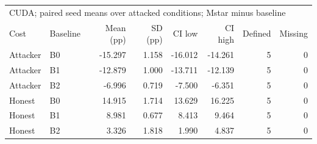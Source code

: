 \begin{tabular}{llrrrrrr}
\toprule
\multicolumn{8}{l}{CUDA; paired seed means over attacked conditions; Mstar minus baseline} \\
Cost & Baseline & Mean (pp) & SD (pp) & CI low & CI high & Defined & Missing \\
\midrule
Attacker & B0 & -15.297 & 1.158 & -16.012 & -14.261 & 5 & 0 \\
Attacker & B1 & -12.879 & 1.000 & -13.711 & -12.139 & 5 & 0 \\
Attacker & B2 & -6.996 & 0.719 & -7.500 & -6.351 & 5 & 0 \\
Honest & B0 & 14.915 & 1.714 & 13.629 & 16.225 & 5 & 0 \\
Honest & B1 & 8.981 & 0.677 & 8.413 & 9.464 & 5 & 0 \\
Honest & B2 & 3.326 & 1.818 & 1.990 & 4.837 & 5 & 0 \\
\bottomrule
\end{tabular}
